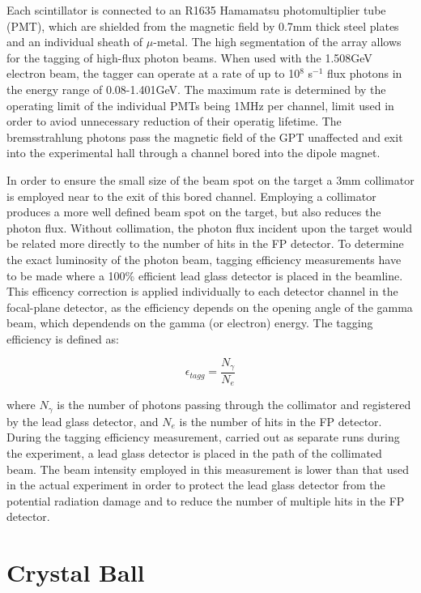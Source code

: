 \indent Each scintillator is connected to an R1635 Hamamatsu photomultiplier tube (PMT), which are shielded from the magnetic field by 0.7mm thick steel plates and an individual sheath of $\mu$-metal. The high segmentation of the array allows for the tagging of high-flux photon beams. When used with the 1.508GeV electron beam, the tagger can operate at a rate of up to 10$^{8}$ s$^{-1}$ flux photons in the energy range of 0.08-1.401GeV. The maximum rate is determined by the operating limit of the individual PMTs being 1MHz per channel, limit used in order to aviod unnecessary reduction of their operatig lifetime. The bremsstrahlung photons pass the magnetic field of the GPT unaffected and exit into the experimental hall through a channel bored into the dipole magnet.

\indent In order to ensure the small size of the beam spot on the target a 3mm collimator is employed near to the exit of this bored channel. Employing a collimator produces a more well defined beam spot on the target, but also reduces the photon flux.  Without collimation, the photon flux incident upon the target would be related more directly to the number of hits in the FP detector. To determine the exact luminosity of the photon beam, tagging efficiency measurements have to be made where a 100\% efficient lead glass detector is placed in the beamline.  This efficency correction is applied individually to each detector channel in the focal-plane detector, as the efficiency depends on the opening angle of the gamma beam, which dependends on the gamma (or electron) energy. The tagging efficiency is defined as:

\begin{equation}
\epsilon_{tagg}=\frac{N_{\gamma}}{N_{e}}
\end{equation}

\indent where $N_{\gamma}$ is the number of photons passing through the collimator and registered by the lead glass detector, and $N_{e}$ is the number of hits in the FP detector. During the tagging efficiency measurement, carried out as separate runs during the experiment, a lead glass detector is placed in the path of the collimated beam. The beam intensity employed in this measurement is lower than that used in the actual experiment in order to protect the lead glass detector from the potential radiation damage and to reduce the number of multiple hits in the FP detector.

\section{Crystal Ball}

